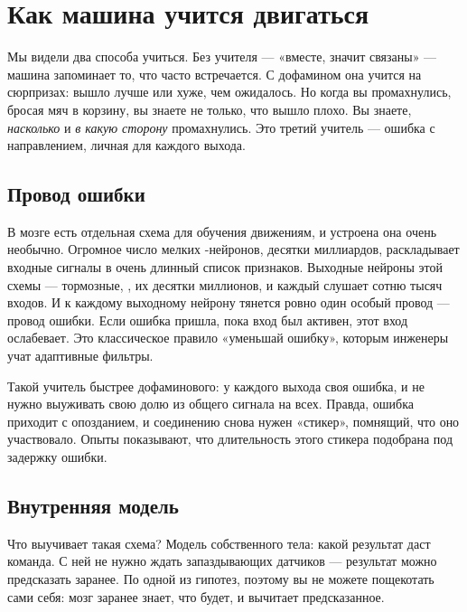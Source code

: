 \chapter{Как машина учится двигаться}

Мы видели два способа учиться. Без учителя --- «вместе, значит связаны» --- машина запоминает то, что часто встречается. С дофамином она учится на сюрпризах: вышло лучше или хуже, чем ожидалось. Но когда вы промахнулись, бросая мяч в корзину, вы знаете не только, что вышло плохо. Вы знаете, \emph{насколько} и \emph{в какую сторону} промахнулись. Это третий учитель --- ошибка с направлением, личная для каждого выхода.

\section*{Провод ошибки}

В мозге есть отдельная схема для обучения движениям, и устроена она очень необычно. Огромное число мелких -нейронов, десятки миллиардов, раскладывает входные сигналы в очень длинный список признаков. Выходные нейроны этой схемы --- тормозные, , их десятки миллионов, и каждый слушает сотню тысяч входов. И к каждому выходному нейрону тянется ровно один особый провод --- провод ошибки. Если ошибка пришла, пока вход был активен, этот вход ослабевает. Это классическое правило «уменьшай ошибку», которым инженеры учат адаптивные фильтры.


Такой учитель быстрее дофаминового: у каждого выхода своя ошибка, и не нужно выуживать свою долю из общего сигнала на всех. Правда, ошибка приходит с опозданием, и соединению снова нужен «стикер», помнящий, что оно участвовало. Опыты показывают, что длительность этого стикера подобрана под задержку ошибки.

\section*{Внутренняя модель}

Что выучивает такая схема? Модель собственного тела: какой результат даст команда. С ней не нужно ждать запаздывающих датчиков --- результат можно предсказать заранее. По одной из гипотез, поэтому вы не можете пощекотать сами себя: мозг заранее знает, что будет, и вычитает предсказанное.

